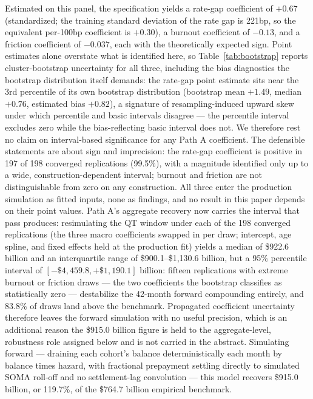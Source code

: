 \documentclass[12pt]{article}
\begin{document}
Estimated on this panel, the specification yields a rate-gap coefficient of $+0.67$ (standardized; the training standard deviation of the rate gap is 221bp, so the equivalent per-100bp coefficient is $+0.30$), a burnout coefficient of $-0.13$, and a friction coefficient of $-0.037$, each with the theoretically expected sign. Point estimates alone overstate what is identified here, so Table~\ref{tab:bootstrap} reports cluster-bootstrap uncertainty for all three, including the bias diagnostics the bootstrap distribution itself demands: the rate-gap point estimate sits near the 3rd percentile of its own bootstrap distribution (bootstrap mean $+1.49$, median $+0.76$, estimated bias $+0.82$), a signature of resampling-induced upward skew under which percentile and basic intervals disagree --- the percentile interval excludes zero while the bias-reflecting basic interval does not. We therefore rest no claim on interval-based significance for any Path A coefficient. The defensible statements are about sign and imprecision: the rate-gap coefficient is positive in 197 of 198 converged replications (99.5\%), with a magnitude identified only up to a wide, construction-dependent interval; burnout and friction are not distinguishable from zero on any construction. All three enter the production simulation as fitted inputs, none as findings, and no result in this paper depends on their point values. Path A's aggregate recovery now carries the interval that pass produces: resimulating the QT window under each of the 198 converged replications (the three macro coefficients swapped in per draw; intercept, age spline, and fixed effects held at the production fit) yields a median of \$922.6 billion and an interquartile range of \$900.1--\$1{,}130.6 billion, but a 95\% percentile interval of $[-\$4{,}459.8, +\$1{,}190.1]$ billion: fifteen replications with extreme burnout or friction draws --- the two coefficients the bootstrap classifies as statistically zero --- destabilize the 42-month forward compounding entirely, and 83.8\% of draws land above the benchmark. Propagated coefficient uncertainty therefore leaves the forward simulation with no useful precision, which is an additional reason the \$915.0 billion figure is held to the aggregate-level, robustness role assigned below and is not carried in the abstract. Simulating forward --- draining each cohort's balance deterministically each month by balance times hazard, with fractional prepayment settling directly to simulated SOMA roll-off and no settlement-lag convolution --- this model recovers \$915.0 billion, or 119.7\%, of the \$764.7 billion empirical benchmark.
\end{document}
